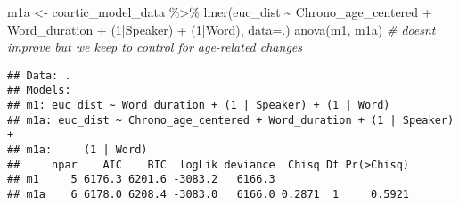 \documentclass[
]{article}
\newenvironment{Shaded}{\begin{snugshade}}{\end{snugshade}}
\newcommand{\AttributeTok}[1]{\textcolor[rgb]{0.77,0.63,0.00}{#1}}
\newcommand{\CommentTok}[1]{\textcolor[rgb]{0.56,0.35,0.01}{\textit{#1}}}
\newcommand{\ConstantTok}[1]{\textcolor[rgb]{0.00,0.00,0.00}{#1}}
\newcommand{\DecValTok}[1]{\textcolor[rgb]{0.00,0.00,0.81}{#1}}
\newcommand{\FunctionTok}[1]{\textcolor[rgb]{0.00,0.00,0.00}{#1}}
\newcommand{\NormalTok}[1]{#1}
\newcommand{\OtherTok}[1]{\textcolor[rgb]{0.56,0.35,0.01}{#1}}
\newcommand{\SpecialCharTok}[1]{\textcolor[rgb]{0.00,0.00,0.00}{#1}}
\newcommand{\StringTok}[1]{\textcolor[rgb]{0.31,0.60,0.02}{#1}}
\begin{document}
\begin{Shaded}
\begin{Highlighting}[]
\NormalTok{m1a }\OtherTok{\textless{}{-}}\NormalTok{ coartic\_model\_data }\SpecialCharTok{\%\textgreater{}\%}
  \FunctionTok{lmer}\NormalTok{(euc\_dist }\SpecialCharTok{\textasciitilde{}}\NormalTok{ Chrono\_age\_centered }\SpecialCharTok{+} 
\NormalTok{         Word\_duration }\SpecialCharTok{+} 
\NormalTok{         (}\DecValTok{1}\SpecialCharTok{|}\NormalTok{Speaker) }\SpecialCharTok{+} 
\NormalTok{         (}\DecValTok{1}\SpecialCharTok{|}\NormalTok{Word), }
       \AttributeTok{data=}\NormalTok{.) }
\FunctionTok{anova}\NormalTok{(m1, m1a) }\CommentTok{\# doesn\textquotesingle{}t improve but we keep to control for age{-}related changes}
\end{Highlighting}
\end{Shaded}

\begin{verbatim}
## Data: .
## Models:
## m1: euc_dist ~ Word_duration + (1 | Speaker) + (1 | Word)
## m1a: euc_dist ~ Chrono_age_centered + Word_duration + (1 | Speaker) + 
## m1a:     (1 | Word)
##     npar    AIC    BIC  logLik deviance  Chisq Df Pr(>Chisq)
## m1     5 6176.3 6201.6 -3083.2   6166.3                     
## m1a    6 6178.0 6208.4 -3083.0   6166.0 0.2871  1     0.5921
\end{verbatim}

\begin{Shaded}
\end{Shaded}
\end{document}
